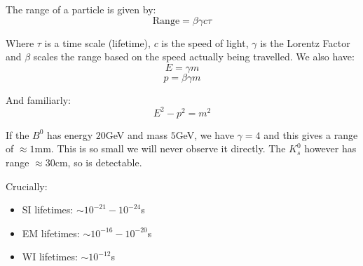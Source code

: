 The range of a particle is given by:
\[
    \text{Range} = \beta \gamma c \tau
\]

Where $\tau$ is a time scale (lifetime), $c$ is the speed of light, $\gamma$ is the Lorentz Factor and $\beta$ scales the range based on the speed actually being travelled. We also have:
\[
    E = \gamma m
\]
\[
    p = \beta \gamma m
\]

And familiarly:
\[
    E^2 - p^2 = m^2
\]

If the $B^0$ has energy $20$GeV and mass $5$GeV, we have $\gamma = 4$ and this gives a range of $\approx 1$mm. This is so small we will never observe it directly. The $K_s^0$ however has range $\approx 30$cm, so is detectable.

Crucially:
\begin{itemize}
    \item SI lifetimes: $\sim 10^{-21} - 10^{-24}$s
    \item EM lifetimes: $\sim 10^{-16} - 10^{-20}$s
    \item WI lifetimes: $\sim 10^{-12}$s
\end{itemize}
